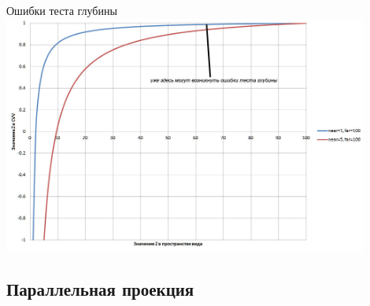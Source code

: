 \documentclass[10pt]{beamer}
\begin{document}
	
	\begin{frame}{Ошибки теста глубины}
		\includegraphics[width=0.9\textwidth]{ee71bce921374ab9a24715b9e3289e10.jpg}
	\end{frame}
	
	\subsection{Параллельная проекция}
	
\end{document}
